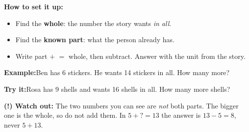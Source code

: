 \documentclass[12pt]{article}
\begin{document}
\begin{formulabox}\textbf{How to set it up:}\\[4pt]
\begin{itemize}[leftmargin=1cm, itemsep=1pt, topsep=2pt]
  \item Find the \textbf{whole}: the number the story wants \emph{in all}.
  \item Find the \textbf{known part}: what the person already has.
  \item Write part $+$  $=$ whole, then subtract. Answer with the unit from the story.
\end{itemize}
\end{formulabox}
\begin{examplebox}\textbf{Example:}\quad Ben has 6 stickers. He wants 14 stickers in all. How many more?
\end{examplebox}
\begin{tryitbox}\textbf{Try it:}\quad Rosa has 9 shells and wants 16 shells in all. How many more shells?\\[2pt]
\end{tryitbox}

\begin{watchoutbox}\textbf{(!) Watch out:} The two numbers you can see are \emph{not}
both parts. The bigger one is the whole, so do not add them. In $5 + ? = 13$ the
answer is $13 - 5 = 8$, never $5 + 13$.
\end{watchoutbox}
\end{document}
